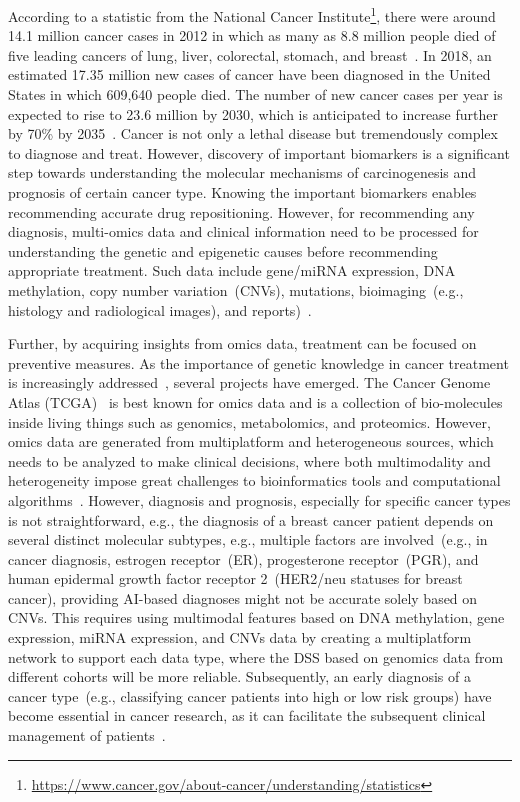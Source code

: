 \hspace*{3.5mm} According to a statistic from the National Cancer Institute\footnote{\url{https://www.cancer.gov/about-cancer/understanding/statistics}}, there were around 14.1 million cancer cases in 2012 in which as many as 8.8 million people died of five leading cancers of lung, liver, colorectal, stomach, and breast~\cite{stat}. In 2018, an estimated 17.35 million new cases of cancer have been diagnosed in the United States in which 609,640 people died. The number of new cancer cases per year is expected to rise to 23.6 million by 2030, which is anticipated to increase further by 70\% by 2035~\cite{71Torre}. Cancer is not only a lethal disease but tremendously complex to diagnose and treat. However, discovery of important biomarkers is a significant step towards understanding the molecular mechanisms of carcinogenesis and prognosis of certain cancer type. Knowing the important biomarkers enables recommending accurate drug repositioning. However, for recommending any diagnosis, multi-omics data and clinical information need to be processed for understanding the genetic and epigenetic causes before recommending appropriate treatment. Such data include gene/miRNA expression, DNA methylation, copy number variation~(CNVs), mutations, bioimaging~(e.g., histology and radiological images), and reports)~\cite{22Ding, 23Zheng}.  

\hspace*{3.5mm} Further, by acquiring insights from omics data, treatment can be focused on preventive measures. As the importance of genetic knowledge in cancer treatment is increasingly addressed~\cite{15Wu}, several projects have emerged. The Cancer Genome Atlas (TCGA)~\cite{tomczak2015cancer} is best known for omics data and is a collection of bio-molecules inside living things such as genomics, metabolomics, and proteomics. However, omics data are generated from multiplatform and heterogeneous sources, which needs to be analyzed to make clinical decisions, where both multimodality and heterogeneity impose great challenges to bioinformatics tools and computational algorithms~\cite{karimACCESS2019,karimBIB2019}. However, diagnosis and prognosis, especially for specific cancer types is not straightforward, e.g., the diagnosis of a breast cancer patient depends on several distinct molecular subtypes, e.g., multiple factors are involved~(e.g., in cancer diagnosis, estrogen receptor~(ER), progesterone receptor~(PGR), and human epidermal growth factor receptor 2~(HER2/neu statuses for breast cancer), providing AI-based diagnoses might not be accurate solely based on CNVs. This requires using multimodal features based on DNA methylation, gene expression, miRNA expression, and CNVs data by creating a multiplatform network to support each data type, where the DSS based on genomics data from different cohorts will be more reliable. Subsequently, an early diagnosis of a cancer type~(e.g., classifying cancer patients into high or low risk groups) have become essential in cancer research, as it can facilitate the subsequent clinical management of patients~\cite{kourou2015machine}.  

